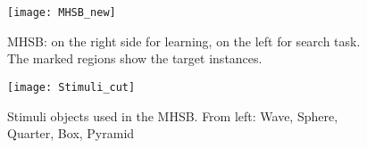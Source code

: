 \begin{figure}[H]
	\begin{minipage}[t]{0.59\textwidth}
		\texttt{[image: MHSB\_new]}
		\captionsetup{width=0.9\linewidth}
		\caption{MHSB: on the right side for learning, on the left for search task. The marked regions show the target instances.}
		\label{MHSBBOARDS}
	\end{minipage}
	\hspace{\fill}
	\begin{minipage}[t]{0.39\textwidth}
		\texttt{[image: Stimuli\_cut]}
		\captionsetup{width=0.9\linewidth}
		\caption{Stimuli objects used in the MHSB. From left: Wave, Sphere, Quarter, Box, Pyramid}
		\label{Stimuli}
	\end{minipage}
\end{figure}


